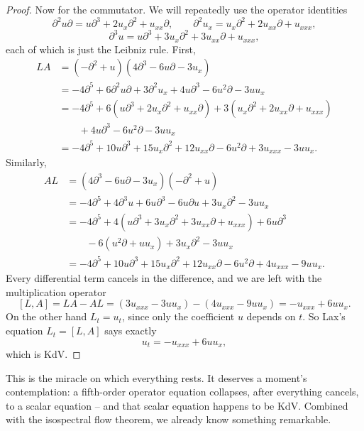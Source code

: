 \begin{proof}
	Now for the commutator. We will repeatedly use the operator identities
	$$
	\partial^2 u\partial = u\partial^3 + 2u_x\partial^2 + u_{xx}\partial, \qquad
	\partial^2 u_x = u_x\partial^2 + 2u_{xx}\partial + u_{xxx},
	$$
	$$
	\partial^3 u = u\partial^3 + 3u_x\partial^2 + 3u_{xx}\partial + u_{xxx},
	$$
	each of which is just the Leibniz rule. First,
	\begin{align*}
		LA &= \left(-\partial^2 + u\right)\left(4\partial^3 - 6u\partial - 3u_x\right)\\
		&= -4\partial^5 + 6\partial^2u\partial + 3\partial^2u_x + 4u\partial^3 - 6u^2\partial - 3uu_x\\
		&= -4\partial^5 + 6\left(u\partial^3 + 2u_x\partial^2 + u_{xx}\partial\right) + 3\left(u_x\partial^2 + 2u_{xx}\partial + u_{xxx}\right)\\
		&\qquad + 4u\partial^3 - 6u^2\partial - 3uu_x\\
		&= -4\partial^5 + 10u\partial^3 + 15u_x\partial^2 + 12u_{xx}\partial - 6u^2\partial + 3u_{xxx} - 3uu_x.
	\end{align*}
	Similarly,
	\begin{align*}
		AL &= \left(4\partial^3 - 6u\partial - 3u_x\right)\left(-\partial^2 + u\right)\\
		&= -4\partial^5 + 4\partial^3u + 6u\partial^3 - 6u\partial u + 3u_x\partial^2 - 3uu_x\\
		&= -4\partial^5 + 4\left(u\partial^3 + 3u_x\partial^2 + 3u_{xx}\partial + u_{xxx}\right) + 6u\partial^3\\
		&\qquad - 6\left(u^2\partial + uu_x\right) + 3u_x\partial^2 - 3uu_x\\
		&= -4\partial^5 + 10u\partial^3 + 15u_x\partial^2 + 12u_{xx}\partial - 6u^2\partial + 4u_{xxx} - 9uu_x.
	\end{align*}
	Every differential term cancels in the difference, and we are left with the multiplication operator
	$$
	[L,A] = LA - AL = \left(3u_{xxx} - 3uu_x\right) - \left(4u_{xxx} - 9uu_x\right) = -u_{xxx} + 6uu_x.
	$$
	On the other hand $L_t = u_t$, since only the coefficient $u$ depends on $t$. So Lax's equation $L_t = [L,A]$ says exactly
	$$
	u_t = -u_{xxx} + 6uu_x,
	$$
	which is KdV.
\end{proof}

This is the miracle on which everything rests. It deserves a moment's contemplation: a fifth-order operator equation collapses, after everything cancels, to a scalar equation -- and that scalar equation happens to be KdV. Combined with the isospectral flow theorem, we already know something remarkable.

